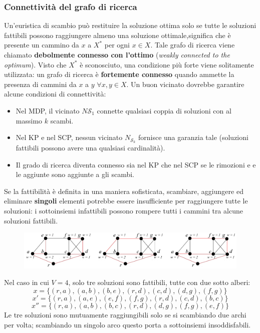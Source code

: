 \documentclass{article}
\begin{document}
\subsubsection{Connettività del grafo di ricerca}
Un'euristica di scambio può restituire la soluzione ottima solo se tutte le soluzioni
fattibili possono raggiungere almeno una soluzione ottimale,significa  che è presente un
cammino da $x$ a $X^*$ per ogni $x\in X$. Tale grafo di ricerca viene chiamato
\textbf{debolmente connesso con l'ottimo} (\textit{weakly connected to the
    optimum}). Visto che $X^*$ è sconosciuto, una condizione più forte viene solitamente utilizzata:
un grafo di ricerca è \textbf{fortemente connesso} quando ammette la presenza di cammini
da $x$ a $y$ $\forall x,y\in X$. Un buon vicinato dovrebbe garantire alcune condizioni di
connettività:
\begin{itemize}
    \item Nel MDP, il vicinato $N\mathcal{S}_1$ connette qualsiasi coppia di soluzioni con
          al massimo $k$ scambi.
    \item Nel KP e nel SCP, nessun vicinato $N_{\mathcal{S}_k}$ fornisce una garanzia tale (soluzioni
          fattibili possono avere una qualsiasi cardinalità).
    \item Il grado di ricerca diventa connesso sia nel KP che nel SCP se le rimozioni e
          e le aggiunte sono aggiunte a gli scambi.
\end{itemize}
Se la fattibilità è definita in una maniera sofisticata, scambiare, aggiungere ed eliminare
\textbf{singoli} elementi potrebbe essere insufficiente per raggiungere tutte le soluzioni:
i sottoinsiemi infattibili possono rompere tutti i cammini tra alcune soluzioni fattibili.
\begin{figure}[H]
    \centering
    \includegraphics[scale=0.45]{images/unf_subsets.png}
\end{figure}
Nel caso in cui $V=4$, solo tre soluzioni sono fattibili, tutte con due sotto alberi:
$$x=\{(r,a),(a,b),(b,e),(r,d),(c,d),(d,g),(f,g)\}$$
$$x'=\{(r,a),(a,e),(e,f),(f,g),(r,d),(c,d),(b,c)\}$$
$$x''=\{(r,a),(a,b),(b,c),(r,d),(d,g),(f,g),(e,f)\}$$
Le tre soluzioni sono mutuamente raggiungibili solo se si scambiando due archi per volta; scambiando
un singolo arco questo porta a sottoinsiemi insoddisfabili.
\end{document}
